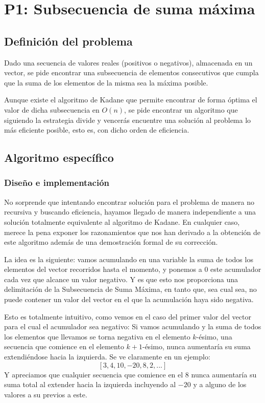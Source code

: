 \documentclass{article}
\begin{document}
\newpage

\section{P1: Subsecuencia de suma máxima}

\subsection{Definición del problema}

    Dado una secuencia de valores reales (positivos o negativos),
    almacenada en un vector, se pide encontrar una subsecuencia de
    elementos consecutivos que cumpla que la suma de los
    elementos de la misma sea la máxima posible. 
    
    Aunque existe el algoritmo de Kadane que permite encontrar de forma
    óptima el valor de dicha subsecuencia en $O(n)$, se pide
    encontrar un algoritmo que siguiendo la estrategia divide
    y vencerás encuentre una solución al problema lo más eficiente
    posible, esto es, con dicho orden de eficiencia.

\subsection{Algoritmo específico} 
\subsubsection{Diseño e implementación}
No sorprende que intentando encontrar solución para el problema de manera
no recursiva y buscando eficiencia, hayamos llegado de manera independiente
a una solución totalmente equivalente al algoritmo de Kadane. En cualquier caso,
merece la pena exponer los razonamientos que nos han derivado a la obtención
de este algoritmo además de una demostración formal de su corrección.

La idea es la siguiente: vamos acumulando en una variable la suma de todos los elementos del vector recorridos hasta el momento, y ponemos a 0 este acumulador cada vez que alcance un valor negativo. Y es que esto nos proporciona una delimitación de la Subsecuencia de Suma Máxima, en tanto que, sea cual sea, no puede contener un valor del vector en el que la acumulación haya sido negativa.

Esto es totalmente intuitivo, como vemos en el caso del primer valor del vector
para el cual el acumulador sea negativo: Si vamos acumulando y la suma de todos
los elementos que llevamos se torna negativa en el elemento $k$-ésimo, una secuencia que comience en el elemento $k+1$-ésimo, nunca aumentaría su suma extendiéndose hacia la izquierda. Se ve claramente en un ejemplo:
\[
[3, 4, 10, -20, 8, 2, ...]
\]
Y apreciamos que cualquier secuencia que comience en el $8$ nunca aumentaría
su suma total al extender hacia la izquierda incluyendo al $-20$ y 
a alguno de los valores a su previos a este.
\end{document}
